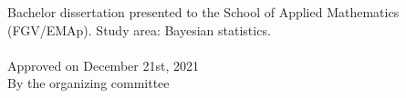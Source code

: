 \begin{folhadeaprovacao}

    \begin{center}
      {\ABNTEXchapterfont\large\MakeUppercase{\imprimirautor}}
  
      \vspace*{\fill}\vspace*{\fill}
      \begin{center}
        \ABNTEXchapterfont\bfseries\large\MakeUppercase{\imprimirtitulo}	
      \end{center}
      \vspace*{\fill}
      
      \hfill
      \begin{minipage}{.7\textwidth}
          Bachelor dissertation presented to the School of Applied Mathematics
          (FGV/EMAp). Study area: Bayesian statistics. \\ \\
          Approved on December 21st, 2021 \\
          By the organizing committee
      \end{minipage}%
      \vspace*{\fill}
     \end{center}
  
\end{folhadeaprovacao}

% 
